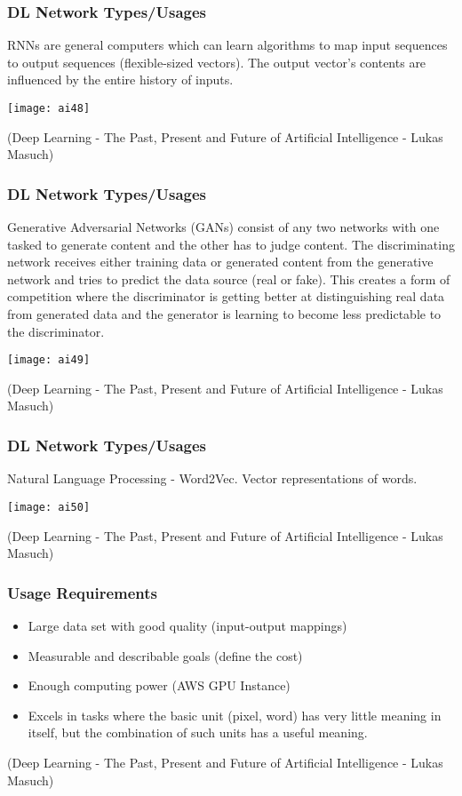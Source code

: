 \begin{frame}[fragile] \frametitle{DL Network Types/Usages}
RNNs are general computers which can learn algorithms to map input
sequences to output sequences (flexible-sized vectors). The output
vector’s contents are influenced by the entire history of inputs. 
\begin{center}
\texttt{[image: ai48]}
\end{center}
{\tiny (Deep Learning - The Past, Present and Future of Artificial Intelligence - Lukas Masuch)}
\end{frame}

\begin{frame}[fragile] \frametitle{DL Network Types/Usages}
Generative Adversarial Networks (GANs) consist of any two networks with one tasked
to generate content and the other has to judge content. The discriminating network
receives either training data or generated content from the generative network and
tries to predict the data source (real or fake). This creates a form of competition
where the discriminator is getting better at distinguishing real data from generated
data and the generator is learning to become less predictable to the discriminator. 

\begin{center}
\texttt{[image: ai49]}
\end{center}
{\tiny (Deep Learning - The Past, Present and Future of Artificial Intelligence - Lukas Masuch)}
\end{frame}


\begin{frame}[fragile] \frametitle{DL Network Types/Usages}
Natural Language Processing - Word2Vec. Vector representations of words.

\begin{center}
\texttt{[image: ai50]}
\end{center}
{\tiny (Deep Learning - The Past, Present and Future of Artificial Intelligence - Lukas Masuch)}
\end{frame}

\begin{frame}[fragile]\frametitle{Usage Requirements}
\begin{itemize}
\item Large data set with good quality (input-output mappings)
\item Measurable and describable goals (define the cost)
\item Enough computing power (AWS GPU Instance)
\item Excels in tasks where the basic unit (pixel, word) has very little
meaning in itself, but the combination of such units has a useful
meaning.
\end{itemize}
{\tiny (Deep Learning - The Past, Present and Future of Artificial Intelligence - Lukas Masuch)}
\end{frame}

